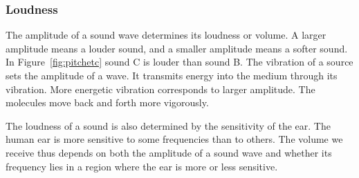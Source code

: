             \subsubsection{Loudness}
            \nopagebreak
        \label{m38799*id183826}The amplitude of a sound wave determines its loudness or volume. A larger amplitude means a louder sound, and a smaller amplitude means a softer sound. In Figure~\ref{fig:pitchetc} sound C is louder than sound B. The vibration of a source sets the amplitude of a wave. It transmits energy into the medium through its vibration. More energetic vibration corresponds to larger amplitude. The molecules move back and forth more vigorously.\par 
        \label{m38799*id183839}The loudness of a sound is also determined by the sensitivity of the ear. The human ear is more sensitive to some frequencies than to others. The volume we receive thus depends on both the amplitude of a sound wave and whether its frequency lies in a region where the ear is more or less sensitive.\par 
      \label{m38799*uid5}
\label{m38799*secfhsst!!!underscore!!!id167}


